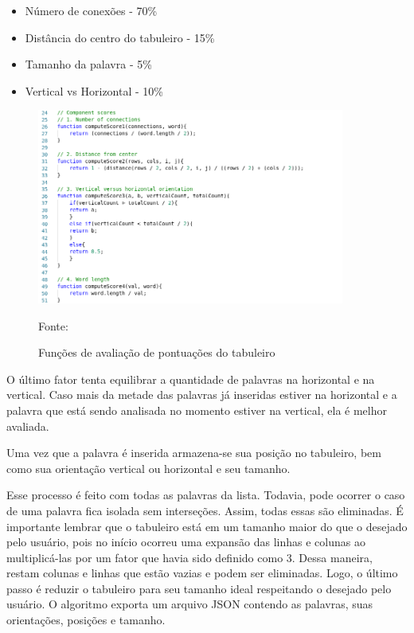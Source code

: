 \begin{itemize}
    \item Número de conexões - 70\%
    \item Distância do centro do tabuleiro - 15\%
    \item Tamanho da palavra - 5\%
    \item Vertical vs Horizontal - 10\%
\end{itemize}

\begin{figure}[H]
\centering
    \caption{Funções de avaliação de pontuações do tabuleiro}
    \label{fig:codeScores}
    \includegraphics[width=0.9\textwidth]{Figuras/codeComponentScores.png}
    
    Fonte: \cite{layoutGenerator}
\end{figure}

O último fator tenta equilibrar a quantidade de palavras na horizontal e na vertical. Caso mais da metade das palavras já inseridas estiver na horizontal e a palavra que está sendo analisada no momento estiver na vertical, ela é melhor avaliada.

Uma vez que a palavra é inserida armazena-se sua posição no tabuleiro, bem como sua orientação vertical ou horizontal e seu tamanho.

Esse processo é feito com todas as palavras da lista. Todavia, pode ocorrer o caso de uma palavra fica isolada sem interseções. Assim, todas essas são eliminadas. É importante lembrar que o tabuleiro está em um tamanho maior do que o desejado pelo usuário, pois no início ocorreu uma expansão das linhas e colunas ao multiplicá-las por um fator que havia sido definido como 3. Dessa maneira, restam colunas e linhas que estão vazias e podem ser eliminadas. Logo, o último passo é reduzir o tabuleiro para seu tamanho ideal respeitando o desejado pelo usuário. O algoritmo exporta um arquivo JSON contendo as palavras, suas orientações, posições e tamanho.

